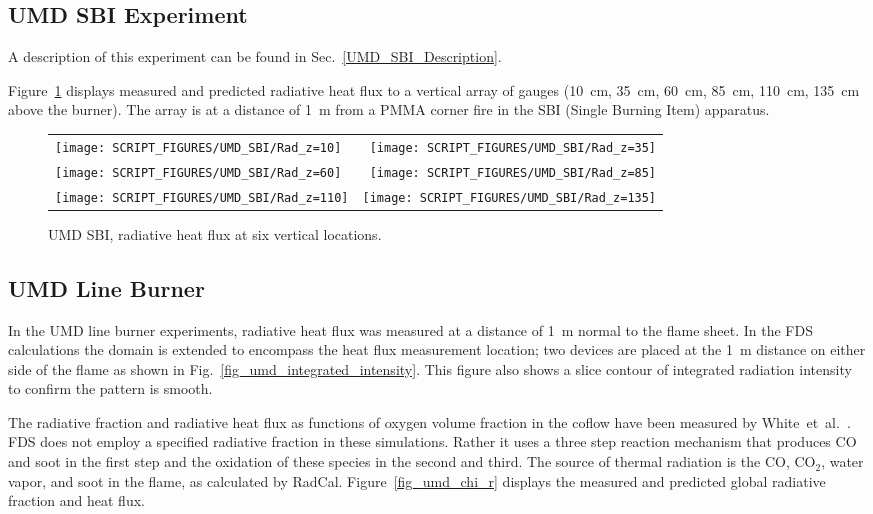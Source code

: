 \clearpage

\subsection{UMD SBI Experiment}

A description of this experiment can be found in Sec.~\ref{UMD_SBI_Description}.

Figure~\ref{UMD_SBI_Rad} displays measured and predicted radiative heat flux to a vertical array of gauges (10~cm, 35~cm, 60~cm, 85~cm, 110~cm, 135~cm above the burner). The array is at a distance of 1~m from a PMMA corner fire in the SBI (Single Burning Item) apparatus.

\begin{figure}[h!]
\begin{tabular*}{\textwidth}{l@{\extracolsep{\fill}}r}
\texttt{[image: SCRIPT\_FIGURES/UMD\_SBI/Rad\_z=10]} &
\texttt{[image: SCRIPT\_FIGURES/UMD\_SBI/Rad\_z=35]} \\
\texttt{[image: SCRIPT\_FIGURES/UMD\_SBI/Rad\_z=60]} &
\texttt{[image: SCRIPT\_FIGURES/UMD\_SBI/Rad\_z=85]} \\
\texttt{[image: SCRIPT\_FIGURES/UMD\_SBI/Rad\_z=110]} &
\texttt{[image: SCRIPT\_FIGURES/UMD\_SBI/Rad\_z=135]}
\end{tabular*}
\caption[UMD SBI, radiative heat flux at six vertical locations]
{UMD SBI, radiative heat flux at six vertical locations.}
\label{UMD_SBI_Rad}
\end{figure}

\clearpage

\subsection{UMD Line Burner}

In the UMD line burner experiments, radiative heat flux was measured at a distance of 1~m normal to the flame sheet.  In the FDS calculations the domain is extended to encompass the heat flux measurement location; two devices are placed at the 1~m distance on either side of the flame as shown in Fig.~\ref{fig_umd_integrated_intensity}. This figure also shows a slice contour of integrated radiation intensity to confirm the pattern is smooth.

The radiative fraction and radiative heat flux as functions of oxygen volume fraction in the coflow have been measured by White~et~al.~\cite{White:2015}.  FDS does not employ a specified radiative fraction in these simulations. Rather it uses a three step reaction mechanism that produces CO and soot in the first step and the oxidation of these species in the second and third. The source of thermal radiation is the CO, CO$_2$, water vapor, and soot in the flame, as calculated by RadCal. Figure~\ref{fig_umd_chi_r} displays the measured and predicted global radiative fraction and heat flux.


